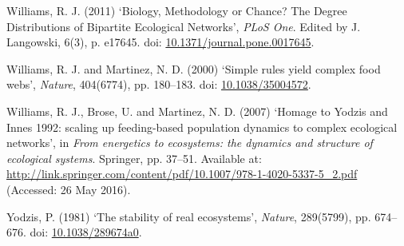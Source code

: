 \documentclass[12pt]{article}
\begin{document}
\hypertarget{ref-will11bmc}{}
Williams, R. J. (2011) `Biology, Methodology or Chance? The Degree
Distributions of Bipartite Ecological Networks', \emph{PLoS One}. Edited
by J. Langowski, 6(3), p. e17645. doi:
\href{https://doi.org/10.1371/journal.pone.0017645}{10.1371/journal.pone.0017645}.

\hypertarget{ref-will00srya}{}
Williams, R. J. and Martinez, N. D. (2000) `Simple rules yield complex
food webs', \emph{Nature}, 404(6774), pp. 180--183. doi:
\href{https://doi.org/10.1038/35004572}{10.1038/35004572}.

\hypertarget{ref-will07hyi}{}
Williams, R. J., Brose, U. and Martinez, N. D. (2007) `Homage to Yodzis
and Innes 1992: scaling up feeding-based population dynamics to complex
ecological networks', in \emph{From energetics to ecosystems: the
dynamics and structure of ecological systems}. Springer, pp. 37--51.
Available at:
\url{http://link.springer.com/content/pdf/10.1007/978-1-4020-5337-5_2.pdf}
(Accessed: 26 May 2016).

\hypertarget{ref-yodz81sre}{}
Yodzis, P. (1981) `The stability of real ecosystems', \emph{Nature},
289(5799), pp. 674--676. doi:
\href{https://doi.org/10.1038/289674a0}{10.1038/289674a0}.
\end{document}
